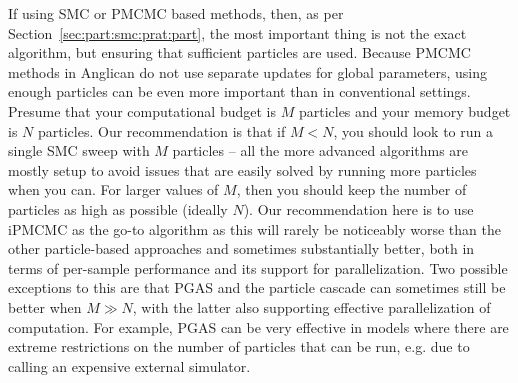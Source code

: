 If using SMC or PMCMC based methods, then, as per Section~\ref{sec:part:smc:prat:part}, the most important
thing is not the exact algorithm, but ensuring that sufficient particles are used.  Because PMCMC methods
in Anglican do not use separate updates for global parameters, using enough particles
can be even more important than in conventional settings.  Presume that your computational budget is $M$
particles and your memory budget is $N$ particles.  Our recommendation is that if $M<N$, you should look
to run a single SMC sweep with $M$ particles -- all the more advanced algorithms are mostly setup to avoid
issues that are easily solved by running more particles when you can.  For larger values of $M$, then you should
keep the number of particles as high as possible (ideally $N$).  Our recommendation here is to use iPMCMC
as the go-to algorithm as this will rarely be noticeably worse than the other particle-based approaches and sometimes
substantially better, both in terms of per-sample performance and its support for parallelization.
Two possible exceptions to this are that PGAS and the particle cascade can sometimes still be better
when $M\gg N$, with the latter also supporting effective parallelization of computation.  
For example, PGAS can be very effective in models where there are extreme restrictions on
the number of particles that can be run, e.g. due to calling an expensive external simulator.
